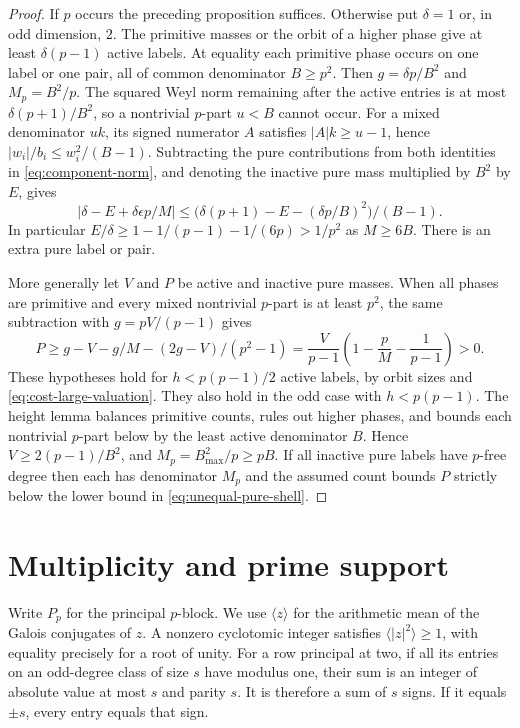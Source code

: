 \documentclass[11pt]{amsart}
\numberwithin{equation}{section}
\theoremstyle{definition}
\theoremstyle{plain}
\begin{document}
\begin{proof}
If $p$ occurs the preceding proposition suffices. Otherwise put
$\delta=1$ or, in odd dimension, $2$. The primitive masses or the
orbit of a higher phase give at least $\delta(p-1)$ active labels.
At equality each primitive phase occurs on one label or one pair,
all of common denominator $B\ge p^2$. Then
$g=\delta p/B^2$ and $M_p=B^2/p$. The squared Weyl norm remaining
after the active entries is at most $\delta(p+1)/B^2$, so a
nontrivial $p$-part $u<B$ cannot occur. For a mixed denominator
$uk$, its signed numerator $A$ satisfies $|A|k\ge u-1$, hence
$|w_i|/b_i\le w_i^2/(B-1)$. Subtracting the pure contributions
from both identities in \eqref{eq:component-norm}, and denoting
the inactive pure mass multiplied by $B^2$ by $E$, gives
\begin{equation}\label{eq:packet-shell}
 |\delta-E+\delta\epsilon p/M|\le
 \bigl(\delta(p+1)-E-(\delta p/B)^2\bigr)/(B-1).
\end{equation}
In particular $E/\delta\ge1-1/(p-1)-1/(6p)>1/p^2$ as $M\ge6B$.
There is an extra pure label or pair.

More generally let $V$ and $P$ be active and inactive pure masses.
When all phases are primitive and every mixed nontrivial $p$-part
is at least $p^2$, the same subtraction with $g=pV/(p-1)$ gives
\begin{equation}\label{eq:unequal-pure-shell}
 P\ge g-V-g/M-(2g-V)/(p^2-1)
  =\frac{V}{p-1}\left(1-\frac pM-\frac1{p-1}\right)>0 .
\end{equation}
These hypotheses hold for $h<p(p-1)/2$ active labels, by orbit sizes
and \eqref{eq:cost-large-valuation}. They also hold in the odd
case with $h<p(p-1)$. The height lemma balances primitive counts,
rules out higher phases, and bounds each nontrivial $p$-part below
by the least active denominator $B$. Hence $V\ge2(p-1)/B^2$,
and $M_p=B_{\max}^2/p\ge pB$. If all inactive pure labels have
$p$-free degree then each has denominator $M_p$ and the assumed
count bounds $P$ strictly below the lower bound in
\eqref{eq:unequal-pure-shell}.
\end{proof}

\section{Multiplicity and prime support}
Write $P_p$ for the principal $p$-block. We use $\langle z\rangle$ for
the arithmetic mean of the Galois conjugates of $z$. A nonzero cyclotomic
integer satisfies $\langle|z|^2\rangle\ge1$, with equality precisely for
a root of unity. For a row principal at two, if all its entries on an odd-degree
class of size $s$ have modulus one, their sum is an integer of absolute value
at most $s$ and parity $s$. It is therefore a sum of $s$ signs. If it
equals $\pm s$, every entry equals that sign.
\end{document}
